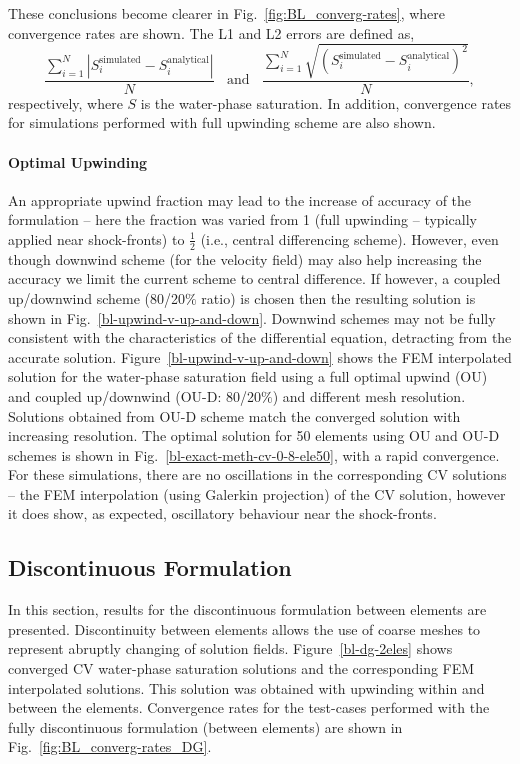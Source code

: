 \documentclass[preprint,authoryear,12pt]{elsarticle}
\begin{document}
These conclusions become clearer in Fig.~\ref{fig:BL_converg-rates}, where convergence rates are shown. The L1 and L2 errors are defined as,
\begin{displaymath}
\displaystyle\frac{\sum\limits_{i=1}^{N}\left|S_{i}^{\text{simulated}}-S_{i}^{\text{analytical}}\right|}{N}\;\;\text{ and }\;\; \displaystyle\frac{\sum\limits_{i=1}^{N}\sqrt{\left(S_{i}^{\text{simulated}}-S_{i}^{\text{analytical}}\right)^{2}}}{N},
\end{displaymath}
respectively, where $S$ is the water-phase saturation. In addition, convergence rates for simulations performed with full upwinding scheme are also shown.


\paragraph{Optimal Upwinding} 
An appropriate upwind fraction may lead to the  increase of accuracy of the formulation -- here the fraction was varied from 1 (full upwinding -- typically applied near shock-fronts) to $\frac{1}{2}$ (i.e., central differencing scheme).  However, even though downwind scheme (for the velocity field) may also help increasing the accuracy we limit the current scheme to central difference. If however, a coupled up/downwind scheme (80/20$\%$ ratio) is chosen then the resulting solution is shown in Fig.~\ref{bl-upwind-v-up-and-down}. Downwind schemes may not be fully consistent with the characteristics of the differential equation, detracting from the accurate solution. Figure~\ref{bl-upwind-v-up-and-down} shows the FEM interpolated solution for the water-phase saturation field using a full optimal upwind (OU) and coupled up/downwind (OU-D: 80/20$\%$) and different mesh resolution. Solutions obtained from OU-D scheme match the converged solution with increasing resolution. The optimal solution for 50 elements using OU and OU-D schemes is shown in Fig.~\ref{bl-exact-meth-cv-0-8-ele50}, with a rapid convergence. For these simulations, there are no oscillations in the corresponding CV solutions -- the FEM interpolation (using Galerkin projection) of the CV solution, however it does show, as expected, oscillatory behaviour near the shock-fronts. 

\subsection{Discontinuous Formulation}
In this section, results for the discontinuous formulation between elements are presented. Discontinuity between elements allows the use of coarse meshes to represent abruptly changing of solution fields. Figure~\ref{bl-dg-2eles} shows converged CV water-phase saturation solutions and the corresponding FEM interpolated solutions. This solution was obtained with upwinding within and between the elements.  Convergence rates for the test-cases performed with the fully discontinuous formulation (between elements) are shown in Fig.~\ref{fig:BL_converg-rates_DG}.
\end{document}
